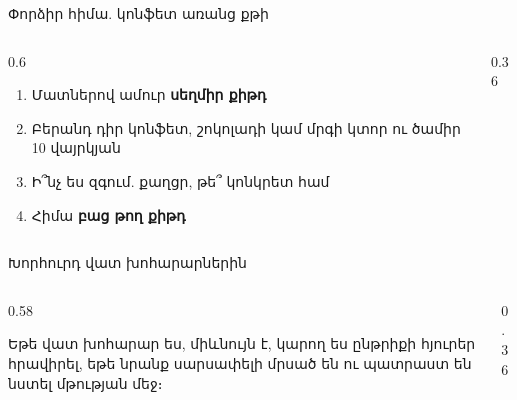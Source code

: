 \begin{frame}{Փորձիր հիմա. կոնֆետ առանց քթի}
  \begin{columns}[c]
    \begin{column}{0.6\textwidth}
      \begin{tryit}
        \begin{enumerate}
          \item Մատներով ամուր \textbf{սեղմիր քիթդ}
          \item Բերանդ դիր կոնֆետ, շոկոլադի կամ մրգի կտոր ու ծամիր 10 վայրկյան
          \item Ի՞նչ ես զգում. քաղցր, թե՞ կոնկրետ համ
          \item Հիմա \textbf{բաց թող քիթդ}
        \end{enumerate}
      \end{tryit}
    \end{column}
    \begin{column}{0.36\textwidth}
      \centering
      \par\medskip
    \end{column}
  \end{columns}
\end{frame}

\begin{frame}{Խորհուրդ վատ խոհարարներին}
  \begin{columns}[c]
    \begin{column}{0.58\textwidth}
      \begin{bookquote}
        Եթե վատ խոհարար ես, միևնույն է, կարող ես ընթրիքի հյուրեր հրավիրել, եթե նրանք սարսափելի մրսած են ու պատրաստ են նստել մթության մեջ։
      \end{bookquote}
      \vspace{2mm}
    \end{column}
    \begin{column}{0.36\textwidth}
      \centering
      \par
      \ 
    \end{column}
  \end{columns}
\end{frame}

